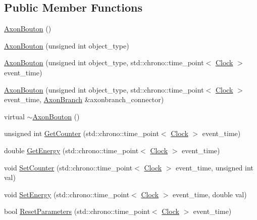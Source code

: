 \subsection*{Public Member Functions}
\begin{DoxyCompactItemize}
\item 
\hyperlink{class_axon_bouton_acd6521d65ecb2b86abf2e3a8b322699e}{Axon\+Bouton} ()
\item 
\hyperlink{class_axon_bouton_a8a2da76b259a5ebab397fbd89d8b0632}{Axon\+Bouton} (unsigned int object\+\_\+type)
\item 
\hyperlink{class_axon_bouton_a93e33d72d90801d29d2b16ef94b59fab}{Axon\+Bouton} (unsigned int object\+\_\+type, std\+::chrono\+::time\+\_\+point$<$ \hyperlink{universe_8h_a0ef8d951d1ca5ab3cfaf7ab4c7a6fd80}{Clock} $>$ event\+\_\+time)
\item 
\hyperlink{class_axon_bouton_a6d671fc3b6bd8e617085c1bc7212400d}{Axon\+Bouton} (unsigned int object\+\_\+type, std\+::chrono\+::time\+\_\+point$<$ \hyperlink{universe_8h_a0ef8d951d1ca5ab3cfaf7ab4c7a6fd80}{Clock} $>$ event\+\_\+time, \hyperlink{class_axon_branch}{Axon\+Branch} \&axonbranch\+\_\+connector)
\item 
virtual \hyperlink{class_axon_bouton_ab6f93f680d19d4f07476d1d1b3de776a}{$\sim$\+Axon\+Bouton} ()
\item 
unsigned int \hyperlink{class_axon_bouton_a251fc23f754c077cf43ee68991b81624}{Get\+Counter} (std\+::chrono\+::time\+\_\+point$<$ \hyperlink{universe_8h_a0ef8d951d1ca5ab3cfaf7ab4c7a6fd80}{Clock} $>$ event\+\_\+time)
\item 
double \hyperlink{class_axon_bouton_a8dff077a40565f4e3a34388a6c38a603}{Get\+Energy} (std\+::chrono\+::time\+\_\+point$<$ \hyperlink{universe_8h_a0ef8d951d1ca5ab3cfaf7ab4c7a6fd80}{Clock} $>$ event\+\_\+time)
\item 
void \hyperlink{class_axon_bouton_afe285478d414f2815afb98abe7b92898}{Set\+Counter} (std\+::chrono\+::time\+\_\+point$<$ \hyperlink{universe_8h_a0ef8d951d1ca5ab3cfaf7ab4c7a6fd80}{Clock} $>$ event\+\_\+time, unsigned int val)
\item 
void \hyperlink{class_axon_bouton_ab24fa467ab7221d0577e54734684a491}{Set\+Energy} (std\+::chrono\+::time\+\_\+point$<$ \hyperlink{universe_8h_a0ef8d951d1ca5ab3cfaf7ab4c7a6fd80}{Clock} $>$ event\+\_\+time, double val)
\item 
bool \hyperlink{class_axon_bouton_a73d3721361c4e1ce6b110ffe1b4a7a88}{Reset\+Parameters} (std\+::chrono\+::time\+\_\+point$<$ \hyperlink{universe_8h_a0ef8d951d1ca5ab3cfaf7ab4c7a6fd80}{Clock} $>$ event\+\_\+time)

\end{DoxyCompactItemize}
